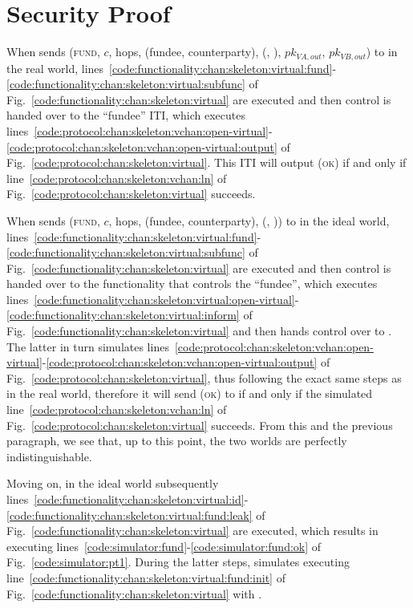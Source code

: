 \section{Security Proof}
  When \environment sends (\textsc{fund}, $c$, hops, (fundee, counterparty),
  (\charlie, \dave), $pk_{\mathit{VA}, out}$, $pk_{\mathit{VB}, out}$) to \alice
  in the real world,
  lines~\ref{code:functionality:chan:skeleton:virtual:fund}-\ref{code:functionality:chan:skeleton:virtual:subfunc}
  of Fig.~\ref{code:functionality:chan:skeleton:virtual} are executed and then
  control is handed over to the ``fundee'' ITI, which executes
  lines~\ref{code:protocol:chan:skeleton:vchan:open-virtual}-\ref{code:protocol:chan:skeleton:vchan:open-virtual:output}
  of Fig.~\ref{code:protocol:chan:skeleton:virtual}.  This ITI will output
  (\textsc{ok}) if and only if line~\ref{code:protocol:chan:skeleton:vchan:ln}
  of Fig.~\ref{code:protocol:chan:skeleton:virtual} succeeds.

  When \environment sends (\textsc{fund}, $c$, hops, (fundee, counterparty),
  (\charlie, \dave)) to \alice in the ideal world,
  lines~\ref{code:functionality:chan:skeleton:virtual:fund}-\ref{code:functionality:chan:skeleton:virtual:subfunc}
  of Fig.~\ref{code:functionality:chan:skeleton:virtual} are executed and then
  control is handed over to the functionality that controls the ``fundee'',
  which executes
  lines~\ref{code:functionality:chan:skeleton:virtual:open-virtual}-\ref{code:functionality:chan:skeleton:virtual:inform}
  of Fig.~\ref{code:functionality:chan:skeleton:virtual} and then hands control
  over to \simulator. The latter in turn simulates
  lines~\ref{code:protocol:chan:skeleton:vchan:open-virtual}-\ref{code:protocol:chan:skeleton:vchan:open-virtual:output}
  of Fig.~\ref{code:protocol:chan:skeleton:virtual}, thus following the exact
  same steps as in the real world, therefore it will send (\textsc{ok}) to
  \fchan if and only if the simulated
  line~\ref{code:protocol:chan:skeleton:vchan:ln} of
  Fig.~\ref{code:protocol:chan:skeleton:virtual} succeeds. From this and the
  previous paragraph, we see that, up to this point, the two worlds are
  perfectly indistinguishable.

  Moving on, in the ideal world subsequently
  lines~\ref{code:functionality:chan:skeleton:virtual:id}-\ref{code:functionality:chan:skeleton:virtual:fund:leak}
  of Fig.~\ref{code:functionality:chan:skeleton:virtual} are executed, which
  results in \simulator executing
  lines~\ref{code:simulator:fund}-\ref{code:simulator:fund:ok} of
  Fig.~\ref{code:simulator:pt1}. During the latter steps, \simulator simulates
  executing line~\ref{code:functionality:chan:skeleton:virtual:fund:init} of
  Fig.~\ref{code:functionality:chan:skeleton:virtual} with \alice.

